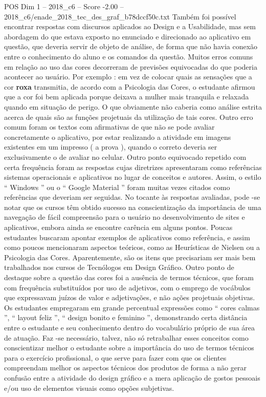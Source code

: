 \begin{textsample}{POS Dim 1 – 2018\_c6 – Score -2.00 – 2018\_c6/enade\_2018\_tec\_des\_graf\_b78dccf50c.txt}
Também foi possível encontrar respostas com discursos aplicados ao Design e a Usabilidade, mas sem abordagem do que estava exposto no enunciado e direcionado ao aplicativo em questão, que deveria servir de objeto de análise, de forma que não havia conexão entre o conhecimento do aluno e os comandos da questão.
Muitos erros comuns em relação ao uso das cores decorreram de previsões equivocadas do que poderia acontecer ao usuário.
Por exemplo : em vez de colocar quais as sensações que a cor \textbf{roxa} transmitia, de acordo com a Psicologia das Cores, o estudante afirmou que a cor foi bem aplicada porque deixava a mulher mais tranquila e relaxada quando em situação de perigo.
O que obviamente não caberia como análise estrita acerca de quais são as funções projetuais da utilização de tais cores.
Outro erro comum foram os textos com afirmativas de que não se pode avaliar concretamente o aplicativo, por estar realizando a atividade em imagens existentes em um impresso ( a prova ), quando o correto deveria ser exclusivamente o de avaliar no celular.
Outro ponto equivocado repetido com certa frequência foram as respostas cujas diretrizes apresentaram como referências sistemas operacionais e aplicativos no lugar de conceitos e autores.
Assim, o estilo “ Windows ” ou o “ Google Material ” foram muitas vezes citados como referências que deveriam ser seguidas.
No tocante às respostas avaliadas, pode -se notar que os cursos têm obtido sucesso na conscientização da importância de uma navegação de fácil compreensão para o usuário no desenvolvimento de sites e aplicativos, embora ainda se encontre carência em alguns pontos.
Poucas estudantes buscaram apontar exemplos de aplicativos como referência, e assim como poucos mencionaram aspectos teóricos, como as Heurísticas de Nielsen ou a Psicologia das Cores.
Aparentemente, são os itens que precisariam ser mais bem trabalhados nos cursos de Tecnólogos em Design Gráfico.
Outro ponto de destaque sobre a questão das cores foi a ausência de termos técnicos, que foram com frequência substituídos por uso de adjetivos, com o emprego de vocábulos que expressavam juízos de valor e adjetivações, e não ações projetuais objetivas.
Os estudantes empregaram em grande percentual expressões como “ cores calmas ”, “ layout feliz ”, “ design bonito e feminino ”, demonstrando certa distância entre o estudante e seu conhecimento dentro do vocabulário próprio de sua área de atuação.
Faz -se necessário, talvez, não só retrabalhar esses conceitos como conscientizar melhor o estudante sobre a importância do uso de termos técnicos para o exercício profissional, o que serve para fazer com que os clientes compreendam melhor os aspectos técnicos dos produtos de forma a não gerar confusão entre a atividade do design gráfico e a mera aplicação de gostos pessoais e/ou uso de elementos visuais como opções subjetivas.

\end{textsample}
